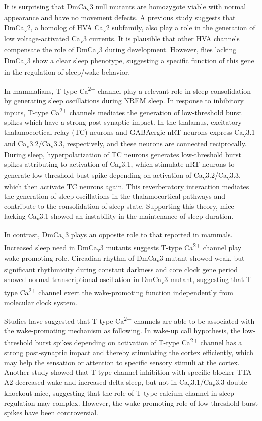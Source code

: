 It is surprising that DmCa\textsubscript{v}3 null mutants are homozygote viable with normal appearance and have no movement defects.
A previous study suggests that DmCa\textsubscript{v}2, a homolog of HVA Ca\textsubscript{v}2 subfamily, also play a role in the generation of low voltage-activated Ca\textsubscript{v}3 currents\cite{Ryglewski:2012jk}.
It is plausible that other HVA channels compensate the role of DmCa\textsubscript{v}3 during development.
However, flies lacking DmCa\textsubscript{v}3 show a clear sleep phenotype, suggesting a specific function of this gene in the regulation of sleep/wake behavior.

In mammalians, T-type Ca\textsuperscript{2+} channel play a relevant role in sleep consolidation by generating sleep oscillations during NREM sleep.
In response to inhibitory inputs, T-type Ca\textsuperscript{2+} channels mediates the generation of low-threshold burst spikes which have a strong post-synaptic impact.
In the thalamus, excitatory thalamocortical relay (TC) neurons and GABAergic nRT neurons express Ca\textsubscript{v}3.1 and Ca\textsubscript{v}3.2/Ca\textsubscript{v}3.3, respectively, and these neurons are connected reciprocally.
During sleep, hyperpolarization of TC neurons generates low-threshold burst spikes attributing to activation of Ca\textsubscript{v}3.1, which stimulate nRT neurons to generate low-threshold bust spike depending on activation of Ca\textsubscript{v}3.2/Ca\textsubscript{v}3.3, which then activate TC neurons again.
This reverberatory interaction mediates the generation of sleep oscillations in the thalamocortical pathways and contribute to the consolidation of sleep state.
Supporting this theory, mice lacking Ca\textsubscript{v}3.1 showed an instability in the maintenance of sleep duration\cite{Lee:2004ey}.

In contrast, DmCa\textsubscript{v}3 plays an opposite role to that reported in mammals.
Increased sleep need in DmCa\textsubscript{v}3 mutants suggests T-type Ca\textsuperscript{2+} channel play wake-promoting role.
Circadian rhythm of DmCa\textsubscript{v}3 mutant showed weak, but significant rhythmicity during constant darkness and core clock gene period showed normal transcriptional oscillation in DmCa\textsubscript{v}3 mutant, suggesting that T-type Ca\textsuperscript{2+} channel exert the wake-promoting function independently from molecular clock system.

Studies have suggested that T-type Ca\textsuperscript{2+} channels are able to be associated with the wake-promoting mechanism as following.
In wake-up call hypothesis, the low-threshold burst spikes depending on activation of T-type Ca\textsuperscript{2+} channel has a strong post-synaptic impact and thereby stimulating the cortex efficiently\cite{swadlow:2001aa}, which may help the sensation or attention to specific sensory stimuli at the cortex.
Another study showed that T-type channel inhibition with specific blocker TTA-A2 decreased wake and increased delta sleep, but not in Ca\textsubscript{v}3.1/Ca\textsubscript{v}3.3 double knockout mice\cite{kraus:2010aa}, suggesting that the role of T-type calcium channel in sleep regulation may complex.
However, the wake-promoting role of low-threshold burst spikes have been controversial\cite{steriade:2001aa}. 

